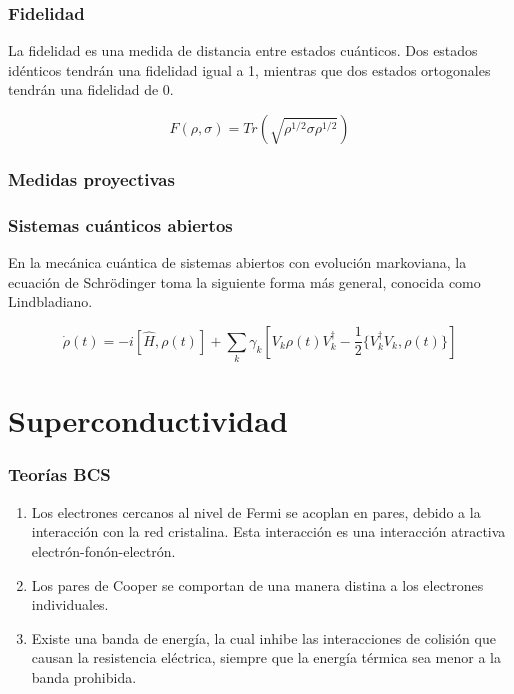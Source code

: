 \documentclass[xetex,mathserif,serif]{beamer}
\begin{document}
\begin{frame}
    \frametitle{Fidelidad}

La fidelidad es una medida de distancia entre estados cuánticos. Dos estados idénticos tendrán una fidelidad igual a 1, mientras que dos estados ortogonales tendrán una fidelidad de 0.

\begin{equation}
    F(\rho, \sigma) = Tr(\sqrt{\rho^{1/2} \sigma \rho^{1/2}})
\end{equation}

\end{frame}

\begin{frame}
    \frametitle{Medidas proyectivas}

\end{frame}

\begin{frame}
    \frametitle{Sistemas cuánticos abiertos}

En la mecánica cuántica de sistemas abiertos con evolución markoviana, la ecuación de Schrödinger toma la siguiente forma más general, conocida como Lindbladiano.

\begin{equation}
    \dot{\rho}(t) = -i [\hat{H}, \rho(t)] + \sum_k \gamma_k [V_k \rho(t) V_k^\dagger - \frac{1}{2} \{V_k^\dagger V_k, \rho(t)\}]
\end{equation}

\end{frame}

\section{Superconductividad}

\begin{frame}
    \frametitle{Teorías BCS}

    \begin{enumerate}
        \item Los electrones cercanos al nivel de Fermi se acoplan en pares, debido a la interacción con la red cristalina. Esta interacción es una interacción atractiva electrón-fonón-electrón.
        \item Los pares de Cooper se comportan de una manera distina a los electrones individuales.
        \item Existe una banda de energía, la cual inhibe las interacciones de colisión que causan la resistencia eléctrica, siempre que la energía térmica sea menor a la banda prohibida.
    \end{enumerate}

\end{frame}
\end{document}

